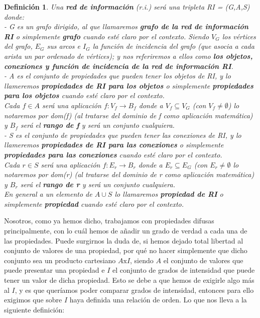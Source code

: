 \documentclass[10pt,a4paper]{article}
\newtheorem{definicion}{Definición}
\begin{document}
\begin{definicion}
\label{defired}
Una \textbf{\textit{red de información}} (\textit{r.i.}) será una tripleta RI = (G,A,S) donde:\\

- G es un grafo dirigido, al que llamaremos \textbf{\textit{grafo de la red de información RI}} o simplemente \textbf{\textit{grafo}} cuando esté claro por el contexto. Siendo $V_{G}$ los vértices del grafo, $E_{G}$ sus arcos e $I_{G}$ la función de incidencia del grafo (que asocia a cada arista un par ordenado de vértices); y nos referiremos a ellos como \textbf{los objetos, conexiones y función de incidencia de la red de información RI}.\\

- A es el conjunto de propiedades que pueden tener los objetos de RI, y lo llameremos \textbf{\textit{propiedades de RI para los objetos}} o simplemente \textbf{\textit{propiedades para los objetos}} cuando esté claro por el contexto.\\
Cada $f \in A$ será una aplicación $f:V_{f} \longrightarrow B_{f}$ donde a $V_{f} \subseteq V_{G}$ (con $V_f \neq \emptyset$) lo notaremos por dom(f) (al tratarse del dominio de f como aplicación matemática) y  $B_{f}$ será el \textit{\textbf{rango de f}}  y será un conjunto cualquiera.\\

- S es el conjunto de propiedades que pueden tener las conexiones de RI, y lo llameremos \textbf{\textit{propiedades de RI para las conexiones}} o simplemente \textbf{\textit{propiedades para las conexiones}} cuando esté claro por el contexto.\\
Cada $r \in S$ será una aplicación $f:E_{r} \longrightarrow B_{r}$ donde a $E_{r} \subseteq E_{G}$ (con $E_r \neq \emptyset$ lo notaremos por dom(r) (al tratarse del dominio de r como aplicación matemática) y  $B_{r}$ será el \textit{\textbf{rango de r}}  y será un conjunto cualquiera.\\

En general a un elemento de $A \cup S$ lo llamaremos \textbf{\textit{propiedad de RI}} o simplemente \textbf{\textit{propiedad}} cuando esté claro por el contexto.
\end{definicion}

Nosotros, como ya hemos dicho, trabajamos con propiedades difusas principalmente, con lo cuál hemos de añadir un grado de verdad a cada una de las propiedades. Puede surgirnos la duda de, si hemos dejado total libertad al conjunto de valores de una propiedad, por qué no hacer simplemente que dicho conjunto sea un producto cartesiano $A\mathrm{x}I$, siendo $A$ el conjunto de valores que puede presentar una propiedad e $I$ el conjunto de grados de intensidad que puede tener un valor de dicha propiedad. Esto se debe a que hemos de exigirle algo más al $I$, y es que queríamos poder comparar grados de intensidad, entonces para ello exigimos que sobre $I$ haya definida una relación de orden. Lo que nos lleva a la siguiente definición:
\end{document}

